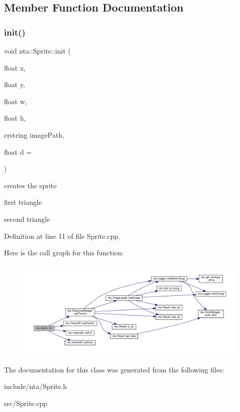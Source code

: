 \subsection{Member Function Documentation}
\mbox{\label{classnta_1_1Sprite_a1054dba693836caca9e755acc530d2fd}} 
\subsubsection{\texorpdfstring{init()}{init()}}
{\footnotesize\ttfamily void nta\+::\+Sprite\+::init (\begin{DoxyParamCaption}\item[{float}]{x,  }\item[{float}]{y,  }\item[{float}]{w,  }\item[{float}]{h,  }\item[{crstring}]{image\+Path,  }\item[{float}]{d = {} }\end{DoxyParamCaption})}



creates the sprite 

first triangle

second triangle 

Definition at line 11 of file Sprite.\+cpp.

Here is the call graph for this function\+:
\nopagebreak
\begin{figure}[H]
\begin{center}
\leavevmode
\includegraphics[width=350pt]{d4/d60/classnta_1_1Sprite_a1054dba693836caca9e755acc530d2fd_cgraph}
\end{center}
\end{figure}


The documentation for this class was generated from the following files\+:\begin{DoxyCompactItemize}
\item 
include/nta/Sprite.\+h\item 
src/Sprite.\+cpp\end{DoxyCompactItemize}
